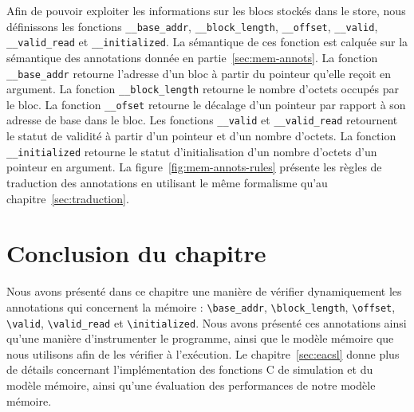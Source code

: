 Afin de pouvoir exploiter les informations sur les blocs stockés dans le store,
nous définissons les fonctions \lstinline'__base_addr',
\lstinline'__block_length', \lstinline'__offset', \lstinline'__valid',
\lstinline'__valid_read' et \lstinline'__initialized'.
La sémantique de ces fonction est calquée sur la sémantique des annotations
\eacsl donnée en partie~\ref{sec:mem-annots}.
La fonction \lstinline'__base_addr' retourne l'adresse d'un bloc à partir du
pointeur qu'elle reçoit en argument.
La fonction \lstinline'__block_length' retourne le nombre d'octets occupés par
le bloc.
La fonction \lstinline'__ofset' retourne le décalage d'un pointeur par rapport à
son adresse de base dans le bloc.
Les fonctions \lstinline'__valid' et \lstinline'__valid_read'
retournent le statut de validité à partir d'un pointeur et d'un nombre d'octets.
La fonction \lstinline'__initialized' retourne le statut d'initialisation
d'un nombre d'octets d'un pointeur en argument.
La figure~\ref{fig:mem-annots-rules} présente les règles de traduction des
annotations en utilisant le même formalisme qu'au chapitre~\ref{sec:traduction}.


\section*{Conclusion du chapitre}


Nous avons présenté dans ce chapitre une manière de vérifier dynamiquement les
annotations \eacsl qui concernent la mémoire : \lstinline'\base_addr',
\lstinline'\block_length', \lstinline'\offset', \lstinline'\valid',
\lstinline'\valid_read' et \lstinline'\initialized'.
Nous avons présenté ces annotations ainsi qu'une manière d'instrumenter le
programme, ainsi que le modèle mémoire que nous utilisons afin de les vérifier
à l'exécution.
Le chapitre~\ref{sec:eacsl} donne plus de détails concernant l'implémentation
des fonctions C de simulation et du modèle mémoire, ainsi qu'une évaluation des
performances de notre modèle mémoire.
